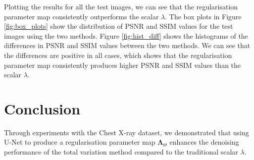 \documentclass[12pt]{article}
\begin{document}
Plotting the results for all the test images, we can see that the regularisation parameter map consistently outperforms the scalar $\lambda$.
The box plots in Figure 
\ref{fig:box_plots} 
show the distribution of PSNR and SSIM values for the test images
using the two methods.
Figure 
\ref{fig:hist_diff}
shows the histograms of the differences in PSNR and SSIM values between the two methods.
We can see that the differences are positive in all cases, which shows that the regularisation parameter map consistently produces higher PSNR and SSIM values than the scalar $\lambda$.












\section{Conclusion}


Through experiments with the Chest X-ray dataset, we demonstrated that using U-Net to produce a regularisation parameter map $\mathbf{\Lambda}_{\Theta}$ enhances the denoising performance of the total variation method compared to the traditional scalar $\lambda$.

\end{document}
